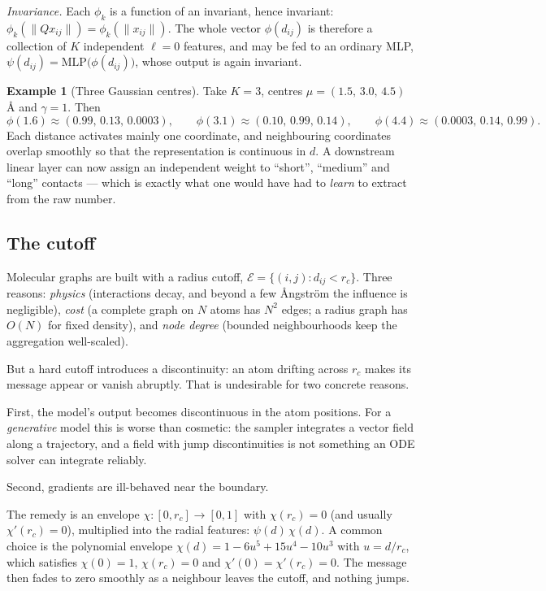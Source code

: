 \documentclass[11pt,a4paper]{report}
\theoremstyle{definition}
\newtheorem{example}[example]{Example}
\theoremstyle{remark}
\begin{document}
\emph{Invariance.} Each $\phi_k$ is a function of an invariant, hence
invariant: $\phi_k(\|Qx_{ij}\|)=\phi_k(\|x_{ij}\|)$. The whole vector
$\phi(d_{ij})$ is therefore a collection of $K$ independent $\ell=0$
features, and may be fed to an ordinary MLP,
$\psi(d_{ij})=\mathrm{MLP}\bigl(\phi(d_{ij})\bigr)$, whose output is again
invariant.

\begin{example}[Three Gaussian centres]
\label{ex:rbf-small}
Take $K=3$, centres $\mu=(1.5,\,3.0,\,4.5)$\,\r A and $\gamma=1$. Then
\[
\phi(1.6)\approx(0.99,\,0.13,\,0.0003),
\qquad
\phi(3.1)\approx(0.10,\,0.99,\,0.14),
\qquad
\phi(4.4)\approx(0.0003,\,0.14,\,0.99).
\]
Each distance activates mainly one coordinate, and neighbouring coordinates
overlap smoothly so that the representation is continuous in $d$. A
downstream linear layer can now assign an independent weight to ``short'',
``medium'' and ``long'' contacts --- which is exactly what one would have
had to \emph{learn} to extract from the raw number.
\end{example}

\subsection{The cutoff}
\label{sec:cutoff}

Molecular graphs are built with a radius cutoff,
$\mathcal E=\{(i,j):d_{ij}<r_c\}$. Three reasons:
\emph{physics} (interactions decay, and beyond a few \r Angstr\"om the
influence is negligible), \emph{cost} (a complete graph on $N$ atoms has
$N^2$ edges; a radius graph has $O(N)$ for fixed density), and \emph{node
degree} (bounded neighbourhoods keep the aggregation well-scaled).

But a hard cutoff introduces a discontinuity: an atom drifting across $r_c$
makes its message appear or vanish abruptly. That is undesirable for two
concrete reasons.

First, the model's output becomes discontinuous in the atom positions. For a
\emph{generative} model this is worse than cosmetic: the sampler integrates a
vector field along a trajectory, and a field with jump discontinuities is not
something an ODE solver can integrate reliably.

Second, gradients are ill-behaved near the boundary.

The remedy is an envelope $\chi:[0,r_c]\to[0,1]$ with $\chi(r_c)=0$ (and
usually $\chi'(r_c)=0$), multiplied into the radial features:
$\psi(d)\,\chi(d)$. A common choice is the polynomial envelope
$\chi(d)=1-6u^5+15u^4-10u^3$ with $u=d/r_c$, which satisfies
$\chi(0)=1$, $\chi(r_c)=0$ and $\chi'(0)=\chi'(r_c)=0$. The message then
fades to zero smoothly as a neighbour leaves the cutoff, and nothing jumps.
\end{document}
